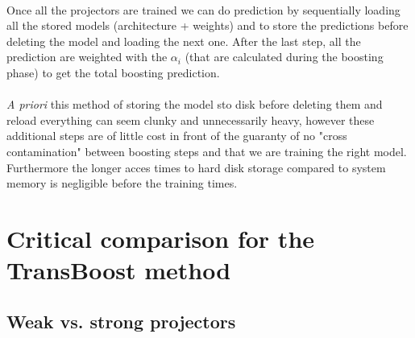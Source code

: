 \documentclass[11 pt]{article}
\begin{document}
\paragraph{} Once all the projectors are trained we can do prediction by sequentially loading all the stored models (architecture + weights) and to store the predictions before deleting the model and loading the next one. After the last step, all the prediction are weighted with the \(\alpha_i\) (that are calculated during the boosting phase) to get the total boosting prediction.

\paragraph{} \emph{A priori} this method of storing the model sto disk before deleting them and reload everything can seem clunky and unnecessarily heavy, however these additional steps are of little cost in front of the guaranty of no "cross contamination" between boosting steps and that we are training the right model. Furthermore the longer acces times to hard disk storage compared to system memory is negligible before the training times. 

\section{Critical comparison for the TransBoost method}

\subsection{Weak vs. strong projectors}
\end{document}
